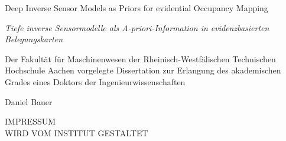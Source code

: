 
\begin{titlepage}
  \centering
  \begin{minipage}[t]{9.8cm}
      \begin{center}
          {\large Deep Inverse Sensor Models as Priors for evidential Occupancy Mapping}
          \bigskip
      \end{center}
  \end{minipage}
  \begin{minipage}[t]{9.8cm}
      \begin{center}
          {\large \textcolor{ikagrey}{\textit{Tiefe inverse Sensormodelle als A-priori-Information in evidenzbasierten Belegungskarten}}}
          \bigskip
      \end{center}
  \end{minipage}
  \vfill
  \begin{minipage}[t]{16.5cm}
      \begin{center}
          Der Fakultät für Maschinenwesen der Rheinisch-Westfälischen Technischen Hochschule Aachen vorgelegte Dissertation zur Erlangung des akademischen Grades eines Doktors der Ingenieurwissenschaften
      \end{center}
  \end{minipage}
  \vfill
  \begin{minipage}[t]{9.8cm}
      \begin{center}
          Daniel Bauer
      \end{center}
  \end{minipage}
  \vfill
\end{titlepage}
\newpage
\pagestyle{empty}
\vspace{10cm}
\begin{center}
  IMPRESSUM\\
  \bigskip
  WIRD VOM INSTITUT GESTALTET
\end{center}
\vfill
\restoregeometry
